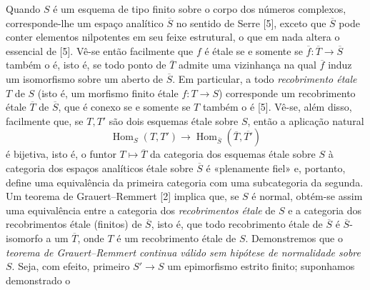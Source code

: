 \documentclass[11pt,twoside,openany]{book}
\numberwithin{equation}{section}
\theoremstyle{plain}
\theoremstyle{definition}
\theoremstyle{remark}
\begin{document}
Quando $S$ é um esquema de tipo finito sobre o corpo dos números
complexos, corresponde-lhe um espaço analítico $\overline S$ no sentido de
Serre [5], exceto que $\overline S$ pode conter elementos nilpotentes em seu
feixe estrutural, o que em nada altera o essencial de [5]. Vê-se então facilmente
que $f$ é étale se e somente se
$\overline f:\overline T\longrightarrow\overline S$ também o é, isto é, se todo
ponto de $\overline T$ admite uma vizinhança na qual $\overline f$ induz um
isomorfismo sobre um aberto de $\overline S$. Em particular, a todo
\emph{recobrimento étale} $T$ de $S$ (isto é, um morfismo finito étale
$f:T\longrightarrow S$) corresponde um recobrimento étale $\overline T$ de
$\overline S$, que é conexo se e somente se $T$ também o é [5]. Vê-se, além
disso, facilmente que, se $T,T'$ são dois esquemas étale sobre $S$, então a
aplicação natural
\[
  \operatorname{Hom}_S(T,T')\longrightarrow
  \operatorname{Hom}_{\overline S}(\overline T,\overline{T'})
\]
é bijetiva, isto é, o funtor $T\longmapsto\overline T$ da categoria dos
esquemas étale sobre $S$ à categoria dos espaços analíticos étale
sobre $\overline S$ é «plenamente fiel» e, portanto, define uma equivalência
da primeira categoria com uma subcategoria da segunda. Um teorema de
Grauert--Remmert [2] implica que, se $S$ é normal, obtém-se assim uma
equivalência entre a categoria dos \emph{recobrimentos étale} de $S$ e a
categoria dos recobrimentos étale (finitos) de $\overline S$, isto é, que
todo recobrimento étale de $\overline S$ é $\overline S$-isomorfo a um
$\overline T$, onde $T$ é um recobrimento étale de $S$. Demonstremos que o
\emph{teorema de Grauert--Remmert continua válido sem hipótese de
normalidade sobre $S$}. Seja, com efeito, primeiro $S'\longrightarrow S$ um
epimorfismo estrito finito; suponhamos demonstrado o
\end{document}
